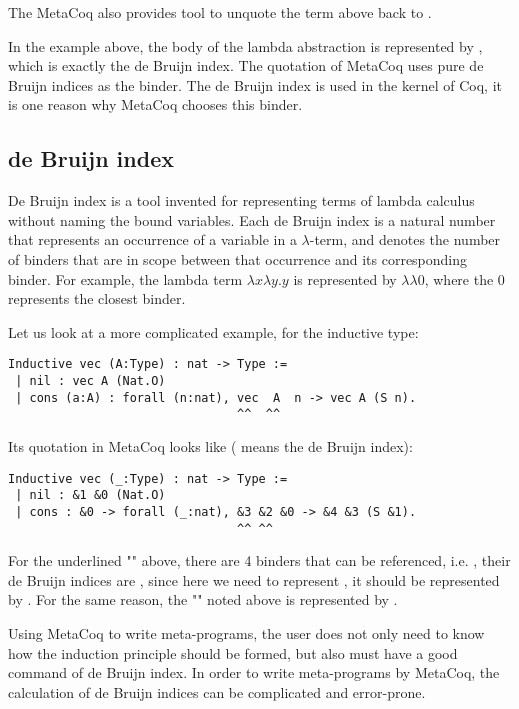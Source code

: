 \documentclass[a4paper,UKenglish,cleveref, autoref, thm-restate]{lipics-v2021}
\begin{document}
The MetaCoq also provides tool to unquote the term above back to .

In the example above, the body of the lambda abstraction is represented by , which is exactly the de Bruijn index\cite{wikidebruijn}. The quotation of MetaCoq uses pure de Bruijn indices as the binder. The de Bruijn index is used in the kernel of Coq, it is one reason why MetaCoq chooses this binder.


\subsection{de Bruijn index}
De Bruijn index is a tool invented for representing terms of lambda calculus without naming the bound variables. Each de Bruijn index is a natural number that represents an occurrence of a variable in a $\lambda$-term, and denotes the number of binders that are in scope between that occurrence and its corresponding binder. For example, the lambda term $\lambda x \lambda y. y$ is represented by $\lambda \lambda 0$, where the $0$ represents the closest binder. 

Let us look at a more complicated example, for the inductive type:
\begin{lstlisting}[language = {Coq}, basicstyle = \small]
Inductive vec (A:Type) : nat -> Type :=
 | nil : vec A (Nat.O)
 | cons (a:A) : forall (n:nat), vec  A  n -> vec A (S n).
                                ^^  ^^
\end{lstlisting}\label{vec}

Its quotation in MetaCoq looks like (\coqe{&_} means the de Bruijn index):
\begin{lstlisting}[language = {Coq}, basicstyle = \small]
Inductive vec (_:Type) : nat -> Type :=
 | nil : &1 &0 (Nat.O)
 | cons : &0 -> forall (_:nat), &3 &2 &0 -> &4 &3 (S &1).
                                ^^ ^^
\end{lstlisting}

For the underlined "" above, there are 4 binders that can be referenced, i.e. , their de Bruijn indices are , since here we need to represent , it should be represented by . For the same reason, the "" noted above is represented by .

Using MetaCoq to write meta-programs, the user does not only need to know how the induction principle should be formed, but also must have a good command of de Bruijn index. In order to write meta-programs by MetaCoq, the calculation of de Bruijn indices can be complicated and error-prone. 
\end{document}
